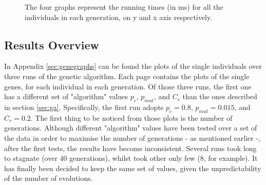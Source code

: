 \begin{figure}[h]
  \captionsetup{justification=centering}
    \caption{The four graphs represent the running times (in ms) for all the individuals in each generation, on y and x axis respectively.}
    \label{fig:runtimes}
\end{figure}

\subsection{Results Overview}
In Appendix \ref{sec:genegraphs} can be found the plots of the single individuals over three runs of the genetic algorithm. Each page contains the plots of the single genes, for each individual in each generation. Of those three runs, the first one has a different set of "algorithm" values $p_c$, $p_{mut}$, and $C_r$ than the ones described in section \ref{sec:ga}. Specifically, the first run adopts $p_c=0.8$, $p_{mut}=0.015$, and $C_r=0.2$. The first thing to be noticed from those plots is the number of generations. Although different "algorithm" values have been tested over a set of the data in order to maximise the number of generations - as mentioned earlier -, after the first tests, the results have become inconsistent. Several runs took long to stagnate (over 40 generations), whilst took other only few (8, for example). It has finally been decided to keep the same set of values, given the unpredictability of the number of evolutions.\\


